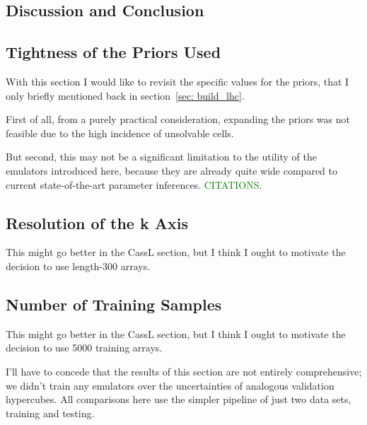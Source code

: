\documentclass[11pt]{article}
\begin{document}
\begin{centering}
\section{Discussion and Conclusion}
\end{centering}

\begin{centering}
\subsection{Tightness of the Priors Used}
\label{sec: priors}
\end{centering}

With this section I would like to revisit the specific values for the priors,
that I only briefly mentioned back in section~\ref{sec: build_lhc}.

First of all, from a purely practical consideration, expanding the priors was
not feasible due to the high incidence of unsolvable cells.

But second, this may not be a significant limitation to the utility of the
emulators introduced here, because they are already quite wide compared to
current state-of-the-art parameter inferences. \textcolor{green}{CITATIONS}.

\begin{centering}
\subsection{Resolution of the k Axis}
\end{centering}

This might go better in the CassL section, but I think I ought to motivate the decision to use length-300 arrays.

\begin{centering}
\subsection{Number of Training Samples}
\end{centering}

This might go better in the CassL section, but I think I ought to motivate the decision to use 5000 training arrays.

I'll have to concede that the results of this section are not entirely comprehensive; we didn't train any emulators over the uncertainties of analogous validation hypercubes. All comparisons here use the simpler pipeline of just two data sets, training and testing.
\end{document}
